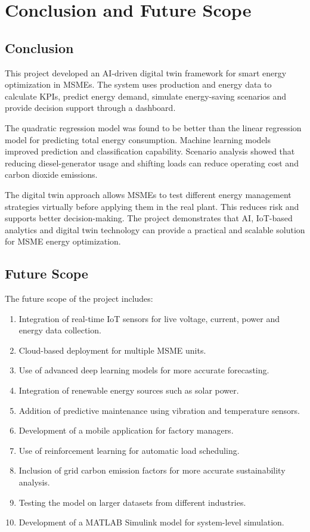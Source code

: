 \chapter{Conclusion and Future Scope}
\label{chap:conclusion}

\section{Conclusion}
This project developed an AI-driven digital twin framework for smart energy optimization in MSMEs. The system uses production and energy data to calculate KPIs, predict energy demand, simulate energy-saving scenarios and provide decision support through a dashboard.

The quadratic regression model was found to be better than the linear regression model for predicting total energy consumption. Machine learning models improved prediction and classification capability. Scenario analysis showed that reducing diesel-generator usage and shifting loads can reduce operating cost and carbon dioxide emissions.

The digital twin approach allows MSMEs to test different energy management strategies virtually before applying them in the real plant. This reduces risk and supports better decision-making. The project demonstrates that AI, IoT-based analytics and digital twin technology can provide a practical and scalable solution for MSME energy optimization.

\section{Future Scope}
The future scope of the project includes:
\begin{enumerate}
    \item Integration of real-time IoT sensors for live voltage, current, power and energy data collection.
    \item Cloud-based deployment for multiple MSME units.
    \item Use of advanced deep learning models for more accurate forecasting.
    \item Integration of renewable energy sources such as solar power.
    \item Addition of predictive maintenance using vibration and temperature sensors.
    \item Development of a mobile application for factory managers.
    \item Use of reinforcement learning for automatic load scheduling.
    \item Inclusion of grid carbon emission factors for more accurate sustainability analysis.
    \item Testing the model on larger datasets from different industries.
    \item Development of a MATLAB Simulink model for system-level simulation.
\end{enumerate}

